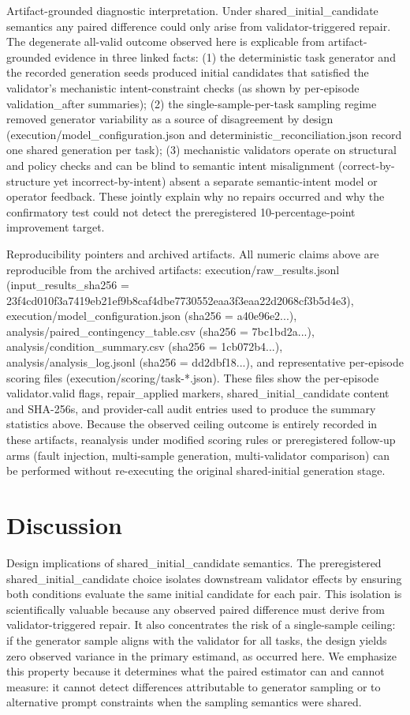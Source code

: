 \documentclass[conference]{IEEEtran}
\begin{document}
Artifact-grounded diagnostic interpretation. Under shared\_initial\_candidate semantics any paired difference could only arise from validator-triggered repair. The degenerate all-valid outcome observed here is explicable from artifact-grounded evidence in three linked facts: (1) the deterministic task generator and the recorded generation seeds produced initial candidates that satisfied the validator's mechanistic intent-constraint checks (as shown by per-episode validation\_after summaries); (2) the single-sample-per-task sampling regime removed generator variability as a source of disagreement by design (execution/model\_configuration.json and deterministic\_reconciliation.json record one shared generation per task); (3) mechanistic validators operate on structural and policy checks and can be blind to semantic intent misalignment (correct-by-structure yet incorrect-by-intent) absent a separate semantic-intent model or operator feedback. These jointly explain why no repairs occurred and why the confirmatory test could not detect the preregistered 10-percentage-point improvement target.

Reproducibility pointers and archived artifacts. All numeric claims above are reproducible from the archived artifacts: execution/raw\_results.jsonl (input\_results\_sha256 = 23f4cd01\allowbreak{}0f3a7419\allowbreak{}eb21ef9b\allowbreak{}8caf4dbe\allowbreak{}7730552e\allowbreak{}aa3f3eaa\allowbreak{}22d2068c\allowbreak{}f3b5d4e3), execution/model\_configuration.json (sha256 = a40e96e2...), analysis/paired\_contingency\_table.csv (sha256 = 7bc1bd2a...), analysis/condition\_summary.csv (sha256 = 1cb072b4...), analysis/analysis\_log.jsonl (sha256 = dd2dbf18...), and representative per-episode scoring files (execution/scoring/task-*.json). These files show the per-episode validator.valid flags, repair\_applied markers, shared\_initial\_candidate content and SHA-256s, and provider-call audit entries used to produce the summary statistics above. Because the observed ceiling outcome is entirely recorded in these artifacts, reanalysis under modified scoring rules or preregistered follow-up arms (fault injection, multi-sample generation, multi-validator comparison) can be performed without re-executing the original shared-initial generation stage.

\section{Discussion}
Design implications of shared\_initial\_candidate semantics. The preregistered shared\_initial\_candidate choice isolates downstream validator effects by ensuring both conditions evaluate the same initial candidate for each pair. This isolation is scientifically valuable because any observed paired difference must derive from validator-triggered repair. It also concentrates the risk of a single-sample ceiling: if the generator sample aligns with the validator for all tasks, the design yields zero observed variance in the primary estimand, as occurred here. We emphasize this property because it determines what the paired estimator can and cannot measure: it cannot detect differences attributable to generator sampling or to alternative prompt constraints when the sampling semantics were shared.
\end{document}

